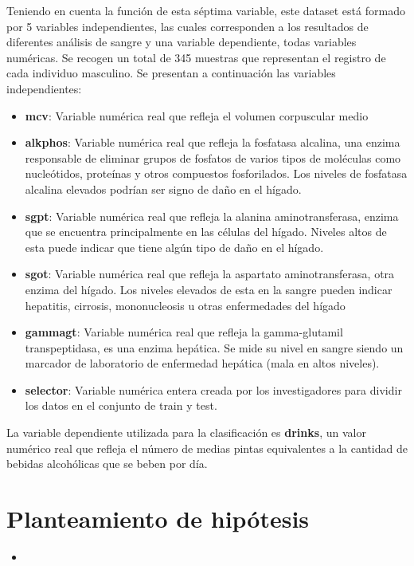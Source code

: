 \vspace{0.5cm}
Teniendo en cuenta la función de esta séptima variable, este dataset está formado por 5 variables independientes, las cuales corresponden a los resultados de diferentes análisis de sangre y una variable dependiente, todas variables numéricas. Se recogen un total de 345 muestras que representan el registro de cada individuo masculino.
Se presentan a continuación las variables independientes:
\begin{itemize}
	\item \textbf{mcv}: Variable numérica real que refleja el volumen corpuscular medio
	
	\item \textbf{alkphos}: Variable numérica real que refleja la fosfatasa alcalina, una enzima responsable de eliminar grupos de fosfatos de varios tipos de moléculas como nucleótidos, proteínas y otros compuestos fosforilados. Los niveles de fosfatasa alcalina elevados podrían ser signo de daño en el hígado.
	
	\item \textbf{sgpt}: Variable numérica real que refleja la alanina aminotransferasa, enzima que se encuentra principalmente en las células del hígado. Niveles altos de esta puede indicar que tiene algún tipo de daño en el hígado. 
	
	\item \textbf{sgot}: Variable numérica real que refleja la aspartato aminotransferasa, otra enzima del hígado. Los niveles elevados de esta en la sangre pueden indicar hepatitis, cirrosis, mononucleosis u otras enfermedades del hígado
	
	\item \textbf{gammagt}: Variable numérica real que refleja la gamma-glutamil transpeptidasa, es una enzima hepática. Se mide su nivel en sangre siendo un marcador de laboratorio de enfermedad hepática (mala en altos niveles).
	
	\item \textbf{selector}: Variable numérica entera creada por los investigadores para dividir los datos en el conjunto de train y test. 
\end{itemize}

La variable dependiente utilizada para la clasificación es \textbf{drinks}, un valor numérico real que refleja el número de medias pintas equivalentes a la cantidad de bebidas alcohólicas que se beben por día. 



\section{Planteamiento de hipótesis}
\begin{itemize}
	\item 
\end{itemize}





